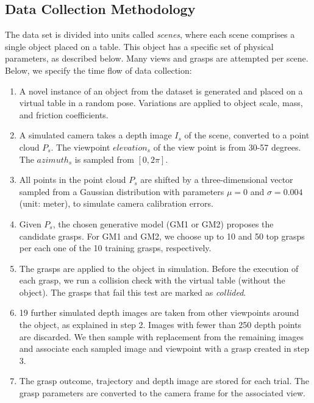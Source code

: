 \subsection{Data Collection Methodology}
\label{subsection:dataCollection}

The data set is divided into units called \textit{scenes}, where each scene comprises a single object placed on a table. This object has a specific set of physical parameters, as described below. Many views and grasps are attempted per scene. Below, we specify the time flow of data collection:

\begin{enumerate}
\item A novel instance of an object from the dataset is generated and placed on a virtual table in a random pose. Variations are applied to object scale, mass, and friction coefficients.
\item A simulated camera takes a depth image $I_s$ of the scene, converted to a point cloud $P_s$. The viewpoint ${elevation}_s$ of the view point is from 30-57 degrees. The ${azimuth}_s$ is sampled from $[0, 2\pi]$. 
\item All points in the point cloud $P_s$ are shifted by a three-dimensional vector sampled from a Gaussian distribution with parameters $\mu=0$ and $\sigma = 0.004$ (unit: meter), to simulate camera calibration errors.
\item Given $P_s$, the chosen generative model (GM1 or GM2) proposes the candidate grasps. For GM1 and GM2, we choose up to 10 and 50 top grasps per each one of the 10 training grasps, respectively.
\item The grasps are applied to the object in simulation. Before the execution of each grasp, we run a collision check with the virtual table (without the object). The grasps that fail this test are marked as \textit{collided}.
\item 19 further simulated depth images are taken from other viewpoints around the object, as explained in step 2. Images with fewer than 250 depth points are discarded. We then sample with replacement from the remaining images and associate each sampled image and viewpoint with a grasp created in step 3.
\item The grasp outcome, trajectory and depth image are stored for each trial. The grasp parameters are converted to the camera frame for the associated view.
\end{enumerate}

